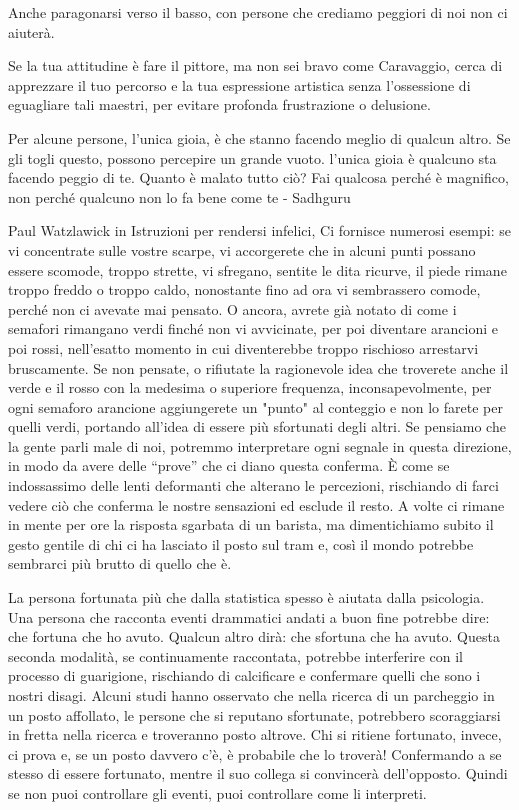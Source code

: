 \documentclass[12pt]{book} %
\begin{document}
Anche paragonarsi verso il basso, con persone che crediamo peggiori di noi non ci aiuterà.

Se la tua attitudine è fare il pittore, ma non sei bravo come
Caravaggio, cerca di apprezzare il tuo percorso e la tua espressione artistica senza l'ossessione di eguagliare tali maestri, per evitare profonda frustrazione o delusione. 

Per alcune persone, l'unica gioia, è che stanno facendo meglio di qualcun altro. Se gli togli questo, possono percepire un grande vuoto. l'unica gioia è qualcuno sta facendo peggio di te. Quanto è malato tutto ciò? Fai qualcosa perché è magnifico, non perché qualcuno non lo fa bene come te - Sadhguru

Paul Watzlawick in Istruzioni per rendersi infelici, Ci fornisce
numerosi esempi: se vi concentrate sulle vostre scarpe, vi accorgerete che in alcuni punti possano essere scomode,
troppo strette, vi sfregano, sentite le dita ricurve, il piede rimane troppo freddo o troppo caldo, nonostante fino ad
ora vi sembrassero comode, perché non ci avevate mai pensato. O ancora, avrete già notato di come i semafori rimangano
verdi finché non vi avvicinate, per poi diventare arancioni e poi rossi, nell'esatto momento in
cui diventerebbe troppo rischioso arrestarvi bruscamente. Se non pensate, o rifiutate la ragionevole idea che troverete
anche il verde e il rosso con la medesima o superiore frequenza, inconsapevolmente, per ogni semaforo arancione
aggiungerete un "punto" al conteggio e non lo farete per quelli verdi, portando all'idea di essere più sfortunati degli
altri. Se pensiamo che la gente parli male di noi, potremmo interpretare 
ogni segnale in questa direzione, in modo da avere delle “prove” che ci diano questa conferma. È come se indossassimo
delle lenti deformanti che alterano le percezioni, rischiando di farci vedere ciò che conferma le nostre sensazioni ed
esclude il resto. A volte ci rimane in mente per ore la risposta sgarbata di un
barista, ma dimentichiamo subito il gesto gentile di chi ci ha lasciato il posto sul tram e, così il mondo potrebbe sembrarci
più brutto di quello che è.

La persona fortunata più che dalla statistica spesso è aiutata dalla psicologia. Una persona che racconta eventi drammatici
andati a buon fine potrebbe dire: che fortuna che ho avuto. Qualcun altro dirà: che sfortuna che ha avuto.
Questa seconda modalità, se continuamente raccontata, potrebbe interferire con il processo di guarigione, rischiando di calcificare e confermare quelli che sono i nostri disagi. 
Alcuni studi hanno osservato che nella ricerca di un parcheggio in un posto affollato, le persone
che si reputano sfortunate, potrebbero scoraggiarsi in fretta nella ricerca e troveranno posto altrove. Chi si ritiene fortunato,
invece, ci prova e, se un posto davvero c'è, è probabile che lo troverà! Confermando a se stesso di essere fortunato, mentre il suo
collega si convincerà dell'opposto. Quindi se non puoi controllare gli eventi, puoi controllare
come li interpreti.
\end{document}

